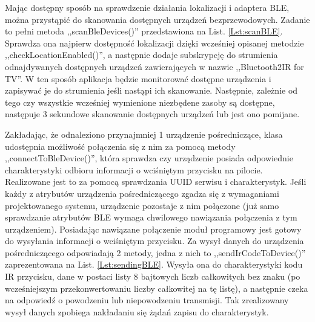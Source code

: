 \documentclass[12pt,twoside,draft]{article}
\begin{document}
Mając dostępny sposób na sprawdzenie działania lokalizacji i adaptera BLE, można przystąpić do skanowania dostępnych urządzeń bezprzewodowych. Zadanie to pełni metoda ,,scanBleDevices()'' przedstawiona na List. \ref*{Lst:scanBLE}. Sprawdza ona najpierw dostępność lokalizacji dzięki wcześniej opisanej metodzie ,,checkLocationEnabled()'', a następnie dodaje subskrypcję do strumienia odnajdywanych dostępnych urządzeń zawierających w nazwie ,,Bluetooth2IR for TV''. W ten sposób aplikacja będzie monitorować dostępne urządzenia i zapisywać je do strumienia jeśli nastąpi ich skanowanie. Następnie, zależnie od tego czy wszystkie wcześniej wymienione niezbędene zasoby są dostępne, następuje 3 sekundowe skanowanie dostępnych urządzeń lub jest ono pomijane.



Zakładając, że odnaleziono przynajmniej 1 urządzenie pośredniczące, klasa udostępnia możliwość połączenia się z nim za pomocą metody ,,connectToBleDevice()'', która sprawdza czy urządzenie posiada odpowiednie charakterystyki odbioru informacji o wciśniętym przycisku na pilocie. Realizowane jest to za pomocą sprawdzania UUID serwisu i charakterystyk. Jeśli każdy z atrybutów urządzenia pośredniczącego zgadza się z wymaganiami projektowanego systemu, urządzenie pozostaje z nim połączone (już samo sprawdzanie atrybutów BLE wymaga chwilowego nawiązania połączenia z tym urządzeniem). Posiadając nawiązane połączenie moduł programowy jest gotowy do wysyłania informacji o wciśniętym przycisku. Za wysył danych do urządzenia pośredniczącego odpowiadają 2 metody, jedna z nich to ,,sendIrCodeToDevice()'' zaprezentowana na List. \ref*{Lst:sendingBLE}. Wysyła ona do charakterystyki kodu IR przycisku, dane w postaci listy 8 bajtowych liczb całkowitych bez znaku (po wcześniejszym przekonwertowaniu liczby całkowitej na tę listę), a następnie czeka na odpowiedź o powodzeniu lub niepowodzeniu transmisji. Tak zrealizowany wysył danych zpobiega nakładaniu się żądań zapisu do charakterystyk.


\end{document}
